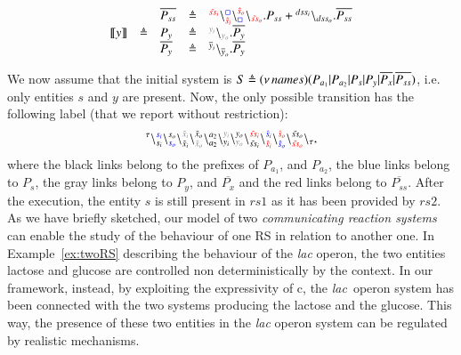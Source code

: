 \begin{example}
\[\begin{array}{lclcl}
&&\overline{P_{ss}}&\defeq &\startchain{{\color{red}\tilde{ss}_i}}\chainedlink{{\color{red}\hat{s}_i}}{{\color{blue}\noact}}\chainedlink{{\color{blue}\noact}}{{\color{red}\hat{s}_o}}\chainend{{\color{red}\tilde{ss}_o}}.P_{ss}
+
\startchain{dss_i}\chainend{dss_o}.\overline{P_{ss}}\\
\llbracket y\rrbracket&\defeq & P_{y}&\defeq &\startchain{{\color{gray}y_i}}\chainend{{\color{gray}y_o}}.\overline{P_{y}} \\
&&\overline{P_{y}}&\defeq &
\startchain{\overline{y}_i}\chainend{\overline{y}_o}.\overline{P_{y}}
\end{array}
\]

\end{example}

\noindent
We now assume that the initial system is $S \triangleq (\nu\, names)(P_{a_1}|P_{a_2}|P_s|P_y|\overline{P_x}|\overline{P_{ss}})$, i.e.
only entities $s$ and $y$ are present. Now, the only possible transition has  the following label (that we report without restriction):
\[
\startchain{\silent}\chainedlink{s_i}{{\color{blue}s_i}}\chainedlink{{\color{blue}s_o}}{s_o}\chainedlink{\tilde{x}_i}{{\color{gray}\tilde{x}_i}}\chainedlink{{\color{gray}\tilde{x}_o}}{\tilde{x}_o} \chainedlink{a_2}{a_2}\chainedlink{y_i}{ {\color{gray}y_i}}\chainedlink{{\color{gray}y_o}}{y_o}\chainedlink{\tilde{ss}_i}{{\color{red}\tilde{ss}_i}}
\chainedlink{{\color{red}\hat{s}_i}}{{\color{blue}\hat{s}_i}}
\chainedlink{{\color{blue}\hat{s}_o}}{{\color{red}\hat{s}_o}}
\chainedlink{{\color{red}\tilde{ss}_o}}{\tilde{ss}_o}\chainend{\silent},
\]
where the black links belong to the prefixes of $P_{a_1}$, and $P_{a_2}$, the blue links belong to $P_s$, the gray links belong to $P_y$, and $\overline{P_x}$ and the red links belong to $\overline{P_{ss}}$.
After the execution, the entity $s$ is still present in $rs1$ as it has been provided by $rs2$.\\

As we have briefly sketched, our model of two \emph{communicating reaction systems} 
can enable the study of the behaviour of one RS
in relation to another one.
In Example~\ref{ex:twoRS} describing  the behaviour of the \emph{lac} operon,
the two entities lactose and glucose are controlled 
non deterministically by the context.
In our framework,
instead, by exploiting the expressivity of c\CNA, 
the \emph{lac} operon system has been connected with the two systems 
producing the lactose and the glucose.
This way, the presence of these two entities in the \emph{lac} operon system 
can be regulated by realistic mechanisms.



